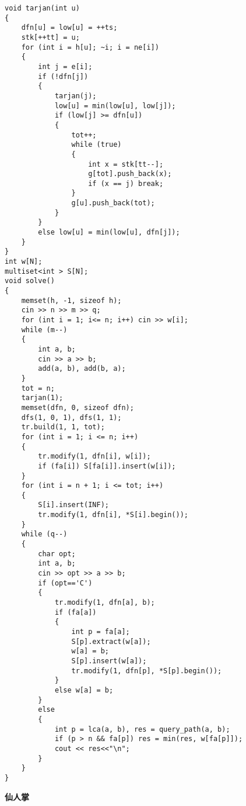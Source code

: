 \documentclass[a4paper, fontset=none]{ctexart}
\begin{document}
\begin{verbatim}
void tarjan(int u)
{
    dfn[u] = low[u] = ++ts;
    stk[++tt] = u;
    for (int i = h[u]; ~i; i = ne[i])
    {
        int j = e[i];
        if (!dfn[j])
        {
            tarjan(j);
            low[u] = min(low[u], low[j]);
            if (low[j] >= dfn[u])
            {
                tot++;
                while (true)
                {
                    int x = stk[tt--];
                    g[tot].push_back(x);
                    if (x == j) break;
                }
                g[u].push_back(tot);
            }
        }
        else low[u] = min(low[u], dfn[j]);
    }
}
int w[N];
multiset<int > S[N];
void solve()
{
    memset(h, -1, sizeof h);
    cin >> n >> m >> q;
    for (int i = 1; i<= n; i++) cin >> w[i];
    while (m--)
    {
        int a, b;
        cin >> a >> b;
        add(a, b), add(b, a);
    }
    tot = n;
    tarjan(1);
    memset(dfn, 0, sizeof dfn);
    dfs(1, 0, 1), dfs(1, 1);
    tr.build(1, 1, tot);
    for (int i = 1; i <= n; i++)
    {
        tr.modify(1, dfn[i], w[i]);
        if (fa[i]) S[fa[i]].insert(w[i]);
    }
    for (int i = n + 1; i <= tot; i++)
    {
        S[i].insert(INF);
        tr.modify(1, dfn[i], *S[i].begin());
    }
    while (q--)
    {
        char opt;
        int a, b;
        cin >> opt >> a >> b;
        if (opt=='C')
        {
            tr.modify(1, dfn[a], b);
            if (fa[a])
            {
                int p = fa[a];
                S[p].extract(w[a]);
                w[a] = b;
                S[p].insert(w[a]);
                tr.modify(1, dfn[p], *S[p].begin());
            }
            else w[a] = b;
        }
        else
        {
            int p = lca(a, b), res = query_path(a, b);
            if (p > n && fa[p]) res = min(res, w[fa[p]]);
            cout << res<<"\n";
        }
    }
}
\end{verbatim}

\textbf{仙人掌}
\end{document}
